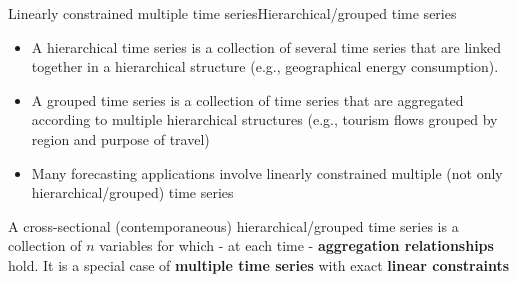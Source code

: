 \documentclass[aspectratio=169, table,colorlinks]{beamer}
\begin{document}
\begin{frame}{Linearly constrained multiple time series}{Hierarchical/grouped time series}
\begin{itemize}
	\item A hierarchical time series is a collection of several time series that are linked together in a hierarchical structure (e.g., geographical energy consumption).
	\item A grouped time series is a collection of time series that are aggregated according to multiple hierarchical structures (e.g., tourism flows grouped by region and purpose of travel)
	\item Many forecasting applications involve {\color{newblue}linearly constrained} multiple (not only {\color{newblue}hierarchical/grouped}) time series
\end{itemize}
\vskip0.25cm
\begin{block}{}
	A cross-sectional (contemporaneous) hierarchical/grouped time series is a collection of $n$ variables for which - at each time - \textbf{aggregation relationships} hold. It is
	a special case of \textbf{multiple time series} with exact \textbf{linear constraints}
\end{block}	
\end{frame}
\end{document}
